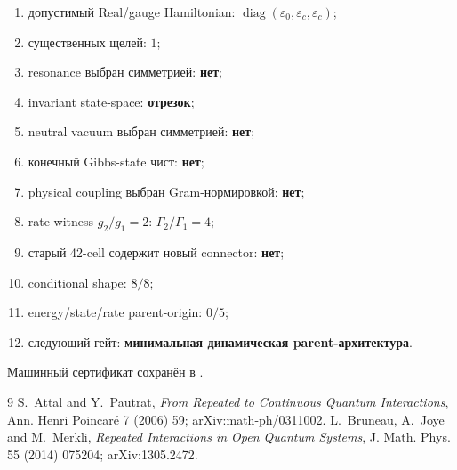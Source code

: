 \begin{protocol}\begin{enumerate}
\item допустимый Real/gauge Hamiltonian: \textbf{$\operatorname{diag}(\varepsilon_0,\varepsilon_c,\varepsilon_c)$};
\item существенных щелей: \textbf{$1$};
\item resonance выбран симметрией: \textbf{нет};
\item invariant state-space: \textbf{отрезок};
\item neutral vacuum выбран симметрией: \textbf{нет};
\item конечный Gibbs-state чист: \textbf{нет};
\item physical coupling выбран Gram-нормировкой: \textbf{нет};
\item rate witness $g_2/g_1=2$: \textbf{$\Gamma_2/\Gamma_1=4$};
\item старый 42-cell содержит новый connector: \textbf{нет};
\item conditional shape: \textbf{$8/8$};
\item energy/state/rate parent-origin: \textbf{$0/5$};
\item следующий гейт: \textbf{минимальная динамическая parent-архитектура}.
\end{enumerate}\end{protocol}

Машинный сертификат сохранён в
.

\begin{thebibliography}{9}
 S.~Attal and Y.~Pautrat,
\emph{From Repeated to Continuous Quantum Interactions},
Ann. Henri Poincar\'e 7 (2006) 59; arXiv:math-ph/0311002.
 L.~Bruneau, A.~Joye and M.~Merkli,
\emph{Repeated Interactions in Open Quantum Systems},
J. Math. Phys. 55 (2014) 075204; arXiv:1305.2472.
\end{thebibliography}